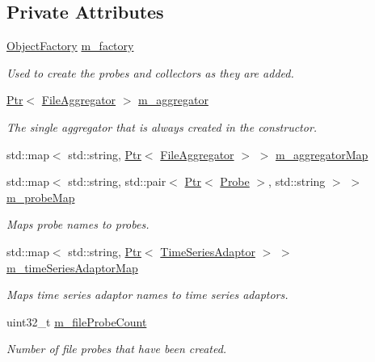 \subsection*{Private Attributes}
\begin{DoxyCompactItemize}
\item 
\hyperlink{classns3_1_1ObjectFactory}{Object\+Factory} \hyperlink{classns3_1_1FileHelper_a5bd6b19fd7ddd11b84e351185d6d6c8c}{m\+\_\+factory}
\begin{DoxyCompactList}\small\item\em Used to create the probes and collectors as they are added. \end{DoxyCompactList}\item 
\hyperlink{classns3_1_1Ptr}{Ptr}$<$ \hyperlink{classns3_1_1FileAggregator}{File\+Aggregator} $>$ \hyperlink{classns3_1_1FileHelper_ac94b4ba749d782ea407482bc699ee436}{m\+\_\+aggregator}
\begin{DoxyCompactList}\small\item\em The single aggregator that is always created in the constructor. \end{DoxyCompactList}\item 
std\+::map$<$ std\+::string, \hyperlink{classns3_1_1Ptr}{Ptr}$<$ \hyperlink{classns3_1_1FileAggregator}{File\+Aggregator} $>$ $>$ \hyperlink{classns3_1_1FileHelper_a3720f097dd381b699a2b852def0f4168}{m\+\_\+aggregator\+Map}
\item 
std\+::map$<$ std\+::string, std\+::pair$<$ \hyperlink{classns3_1_1Ptr}{Ptr}$<$ \hyperlink{classns3_1_1Probe}{Probe} $>$, std\+::string $>$ $>$ \hyperlink{classns3_1_1FileHelper_a69184708162929e89458eed5956791e1}{m\+\_\+probe\+Map}
\begin{DoxyCompactList}\small\item\em Maps probe names to probes. \end{DoxyCompactList}\item 
std\+::map$<$ std\+::string, \hyperlink{classns3_1_1Ptr}{Ptr}$<$ \hyperlink{classns3_1_1TimeSeriesAdaptor}{Time\+Series\+Adaptor} $>$ $>$ \hyperlink{classns3_1_1FileHelper_a2e55bee0c776ab5f14cc2d4dfbfcc361}{m\+\_\+time\+Series\+Adaptor\+Map}
\begin{DoxyCompactList}\small\item\em Maps time series adaptor names to time series adaptors. \end{DoxyCompactList}\item 
uint32\+\_\+t \hyperlink{classns3_1_1FileHelper_a5ecc1318b7c9a79af79f869fe1e7ceac}{m\+\_\+file\+Probe\+Count}
\begin{DoxyCompactList}\small\item\em Number of file probes that have been created. \end{DoxyCompactList}\item 

\end{DoxyCompactItemize}
